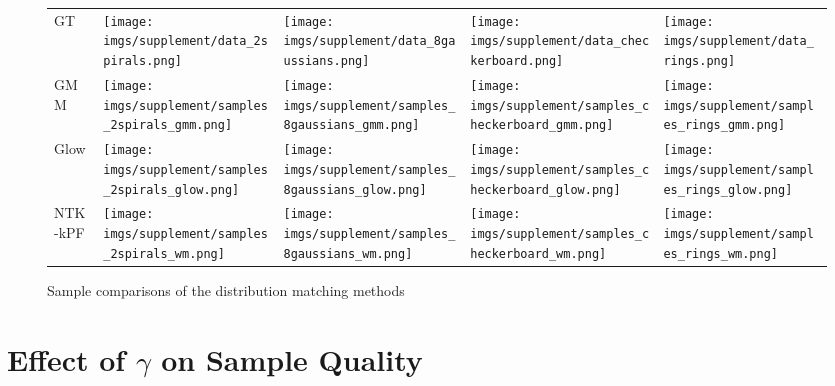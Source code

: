 \begin{figure}[h]
        \centering
        \begin{tabular}{ m{1cm} m{2cm} m{2cm} m{2cm}  m{2cm}  }
            \textrm{GT} &
            \texttt{[image: imgs/supplement/data\_2spirals.png]} &
            \texttt{[image: imgs/supplement/data\_8gaussians.png]} &
            \texttt{[image: imgs/supplement/data\_checkerboard.png]} &
            \texttt{[image: imgs/supplement/data\_rings.png]}\\ 
            \textrm{GMM} &
            \texttt{[image: imgs/supplement/samples\_2spirals\_gmm.png]} &
            \texttt{[image: imgs/supplement/samples\_8gaussians\_gmm.png]} &
            \texttt{[image: imgs/supplement/samples\_checkerboard\_gmm.png]} &
            \texttt{[image: imgs/supplement/samples\_rings\_gmm.png]}\\
            \textrm{Glow} &
            \texttt{[image: imgs/supplement/samples\_2spirals\_glow.png]} &
            \texttt{[image: imgs/supplement/samples\_8gaussians\_glow.png]} &
            \texttt{[image: imgs/supplement/samples\_checkerboard\_glow.png]} &
            \texttt{[image: imgs/supplement/samples\_rings\_glow.png]}\\
            \textrm{NTK-kPF} &
            \texttt{[image: imgs/supplement/samples\_2spirals\_wm.png]} &
            \texttt{[image: imgs/supplement/samples\_8gaussians\_wm.png]} &
            \texttt{[image: imgs/supplement/samples\_checkerboard\_wm.png]} &
            \texttt{[image: imgs/supplement/samples\_rings\_wm.png]}\\
        \end{tabular}
        \caption{\label{fig:samples}Sample comparisons of the distribution matching methods}
\end{figure}

\newcommand{\centered}[1]{\begin{tabular}{l} #1 \end{tabular}}

\clearpage
\section{Effect of $\gamma$ on Sample Quality}

